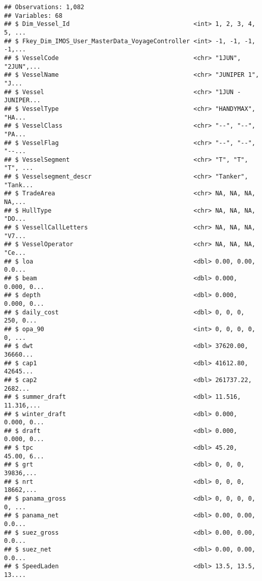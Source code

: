 \documentclass[]{article}
\begin{document}
\begin{verbatim}
## Observations: 1,082
## Variables: 68
## $ Dim_Vessel_Id                                  <int> 1, 2, 3, 4, 5, ...
## $ Fkey_Dim_IMOS_User_MasterData_VoyageController <int> -1, -1, -1, -1,...
## $ VesselCode                                     <chr> "1JUN", "2JUN",...
## $ VesselName                                     <chr> "JUNIPER 1", "J...
## $ Vessel                                         <chr> "1JUN - JUNIPER...
## $ VesselType                                     <chr> "HANDYMAX", "HA...
## $ VesselClass                                    <chr> "--", "--", "PA...
## $ VesselFlag                                     <chr> "--", "--", "--...
## $ VesselSegment                                  <chr> "T", "T", "T", ...
## $ Vesselsegment_descr                            <chr> "Tanker", "Tank...
## $ TradeArea                                      <chr> NA, NA, NA, NA,...
## $ HullType                                       <chr> NA, NA, NA, "DO...
## $ VessellCallLetters                             <chr> NA, NA, NA, "V7...
## $ VesselOperator                                 <chr> NA, NA, NA, "Ce...
## $ loa                                            <dbl> 0.00, 0.00, 0.0...
## $ beam                                           <dbl> 0.000, 0.000, 0...
## $ depth                                          <dbl> 0.000, 0.000, 0...
## $ daily_cost                                     <dbl> 0, 0, 0, 250, 0...
## $ opa_90                                         <int> 0, 0, 0, 0, 0, ...
## $ dwt                                            <dbl> 37620.00, 36660...
## $ cap1                                           <dbl> 41612.80, 42645...
## $ cap2                                           <dbl> 261737.22, 2682...
## $ summer_draft                                   <dbl> 11.516, 11.316,...
## $ winter_draft                                   <dbl> 0.000, 0.000, 0...
## $ draft                                          <dbl> 0.000, 0.000, 0...
## $ tpc                                            <dbl> 45.20, 45.00, 6...
## $ grt                                            <dbl> 0, 0, 0, 39836,...
## $ nrt                                            <dbl> 0, 0, 0, 18662,...
## $ panama_gross                                   <dbl> 0, 0, 0, 0, 0, ...
## $ panama_net                                     <dbl> 0.00, 0.00, 0.0...
## $ suez_gross                                     <dbl> 0.00, 0.00, 0.0...
## $ suez_net                                       <dbl> 0.00, 0.00, 0.0...
## $ SpeedLaden                                     <dbl> 13.5, 13.5, 13....

\end{verbatim}
\end{document}
